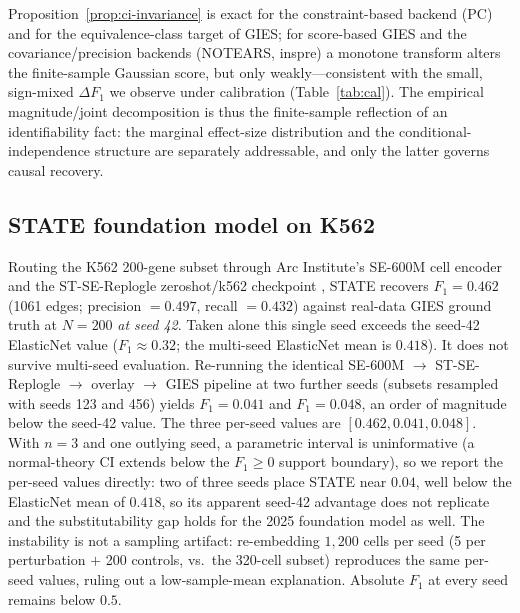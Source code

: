 \documentclass{article}
\theoremstyle{plain}
\theoremstyle{definition}
\theoremstyle{remark}
\begin{document}
Proposition~\ref{prop:ci-invariance} is exact for the constraint-based backend (PC) and for the equivalence-class target of GIES; for score-based GIES and the covariance/precision backends (NOTEARS, inspre) a monotone transform alters the finite-sample Gaussian score, but only weakly---consistent with the small, sign-mixed $\Delta F_1$ we observe under calibration (Table~\ref{tab:cal}). The empirical magnitude/joint decomposition is thus the finite-sample reflection of an identifiability fact: the marginal effect-size distribution and the conditional-independence structure are separately addressable, and only the latter governs causal recovery.

\subsection{STATE foundation model on K562}
\label{sec:state-multi-seed}
Routing the K562 200-gene subset through Arc Institute's SE-600M cell encoder and the ST-SE-Replogle zeroshot/k562 checkpoint \citep{arc2025state}, STATE recovers $F_1 = 0.462$ (1061 edges; precision $= 0.497$, recall $= 0.432$) against real-data GIES ground truth at $N{=}200$ \emph{at seed 42}. Taken alone this single seed exceeds the seed-42 ElasticNet value ($F_1 \approx 0.32$; the multi-seed ElasticNet mean is $0.418$). It does not survive multi-seed evaluation. Re-running the identical SE-600M $\to$ ST-SE-Replogle $\to$ overlay $\to$ GIES pipeline at two further seeds (subsets resampled with seeds 123 and 456) yields $F_1 = 0.041$ and $F_1 = 0.048$, an order of magnitude below the seed-42 value. The three per-seed values are $[0.462, 0.041, 0.048]$. With $n=3$ and one outlying seed, a parametric interval is uninformative (a normal-theory CI extends below the $F_1{\geq}0$ support boundary), so we report the per-seed values directly: two of three seeds place STATE near $0.04$, well below the ElasticNet mean of $0.418$, so its apparent seed-42 advantage does not replicate and the substitutability gap holds for the 2025 foundation model as well. The instability is not a sampling artifact: re-embedding $1{,}200$ cells per seed (5 per perturbation $+$ 200 controls, vs.\ the 320-cell subset) reproduces the same per-seed values, ruling out a low-sample-mean explanation. Absolute $F_1$ at every seed remains below $0.5$.
\end{document}
